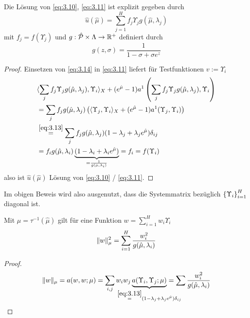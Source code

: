 \begin{lemma}[Lösungsdarstellung]
	Die Lösung von \eqref{eq:3.10}, \eqref{eq:3.11} ist explizit gegeben durch
	\begin{equation}
		\hat u(\hat\mu) = \sum_{j=1}^H f_j \Upsilon_j g(\hat\mu,\lambda_j) \label{eq:3.14}
	\end{equation}
	mit $f_j = f(\Upsilon_j)$ und $g: \hat{\mathcal{P}} \times \Lambda \to \mathbb{R}^+$ definiert durch
	\begin{equation}
		g(z,\sigma) = \frac{1}{1-\sigma+\sigma e^z} \label{eq:3.15}
	\end{equation}

	\begin{proof}
		Einsetzen von \eqref{eq:3.14} in \eqref{eq:3.11} liefert für Testfunktionen $v := \Upsilon_i$
		\begin{align*}
			&\langle \sum_j f_j \Upsilon_j g(\hat\mu,\lambda_j), \Upsilon_i \rangle_X + (e^{\hat\mu}-1) a^1\left( \sum_j f_j \Upsilon_j g(\hat\mu,\lambda_j), \Upsilon_i \right)\\
			&= \sum_j f_j g(\hat\mu,\lambda_j) \left( \langle \Upsilon_j, \Upsilon_i \rangle_X + (e^{\hat\mu}-1) a^1(\Upsilon_j,\Upsilon_i) \right)\\
			&\stackrel{\eqref{eq:3.13}}{=} \sum_j f_j g(\hat\mu,\lambda_j)(1-\lambda_j+\lambda_j e^{\hat\mu}) \delta_{ij}\\
			&= f_i g(\hat\mu,\lambda_i)\underbrace{(1-\lambda_i+\lambda_i e^{\hat\mu})}_{=\frac{1}{g(\hat\mu,\lambda_i)}} = f_i = f(\Upsilon_i) 
		\end{align*}
		also ist $\hat u(\hat\mu)$ Lösung von \eqref{eq:3.10} / \eqref{eq:3.11}.
	\end{proof}
\end{lemma}

\begin{bem}
	Im obigen Beweis wird also ausgenutzt, dass die Systemmatrix bezüglich $\left\{\Upsilon_i\right\}_{i=1}^H$ diagonal ist.
\end{bem}

\begin{lemma}
	Mit $\mu = \tau^{-1}(\hat\mu)$ gilt für eine Funktion $w = \sum_{i=1}^H w_i \Upsilon_i$
	\[
		\|w\|_\mu^2 = \sum_{i=1}^H \frac{w_i^2}{g(\hat\mu,\lambda_i)}
	\]

	\begin{proof}
		\[
			\norm{w}_{\mu} = a(w,w;\mu) = \sum_{i,j} w_i w_j \underbrace{a(\Upsilon_i,\Upsilon_j;\mu)}_{\mathclap{\stackrel{\eqref{eq:3.13}}{=} (1-\lambda_j+\lambda_j e^{\hat\mu}) \delta_{ij}}} = \sum \frac{w_i^2}{g(\hat\mu,\lambda_i)}
		\]
	\end{proof}
\end{lemma}

